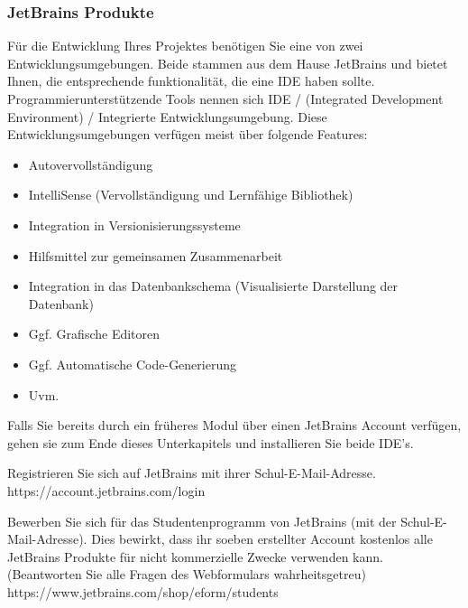 \subsubsection{JetBrains Produkte}\label{subsubsec:jetbrains}
\begin{frame}[fragile]
    Für die Entwicklung Ihres Projektes benötigen Sie eine von zwei Entwicklungsumgebungen.
    Beide stammen aus dem Hause JetBrains und bietet Ihnen, die entsprechende funktionalität, die eine IDE haben sollte.
    Programmierunterstützende Tools nennen sich IDE / (Integrated Development Environment) /
    Integrierte Entwicklungsumgebung.
    Diese Entwicklungsumgebungen verfügen meist über folgende Features:
    \begin{itemize}
        \item Autovervollständigung
        \item IntelliSense (Vervollständigung und Lernfähige Bibliothek)
        \item Integration in Versionisierungssysteme
        \item Hilfsmittel zur gemeinsamen Zusammenarbeit
        \item Integration in das Datenbankschema (Visualisierte Darstellung der Datenbank)
        \item Ggf. Grafische Editoren
        \item Ggf. Automatische Code-Generierung
        \item Uvm.
    \end{itemize}
    Falls Sie bereits durch ein früheres Modul über einen JetBrains Account verfügen, gehen sie zum Ende dieses
    Unterkapitels und installieren Sie beide IDE's.
\end{frame}

\begin{frame}[fragile]

    Registrieren Sie sich auf JetBrains mit ihrer Schul-E-Mail-Adresse.
    https://account.jetbrains.com/login

    Bewerben Sie sich für das Studentenprogramm von JetBrains (mit der Schul-E-Mail-Adresse).
    Dies bewirkt, dass ihr soeben erstellter Account kostenlos alle JetBrains Produkte für nicht kommerzielle Zwecke verwenden kann.
    (Beantworten Sie alle Fragen des Webformulars wahrheitsgetreu)
    https://www.jetbrains.com/shop/eform/students
\end{frame}

